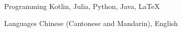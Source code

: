 

\begin{cvskills}

  \cvskill
    {Programming} %
    {Kotlin, Julia, Python, Java, LaTeX} %

  \cvskill
    {Languages} %
    {Chinese (Cantonese and Mandarin), English} %

\end{cvskills}
